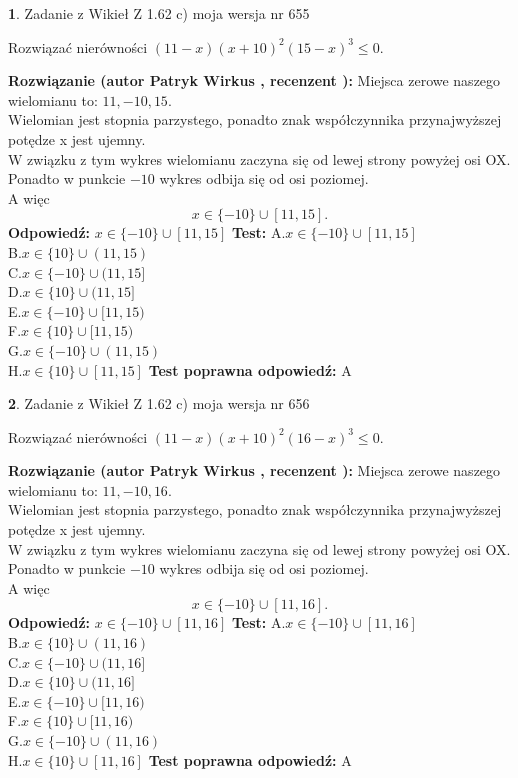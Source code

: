\documentclass[12pt, a4paper]{article}
\theoremstyle{definition} %
\newtheorem{zad}{}
\newcommand{\zadStart}[1]{\begin{zad}#1\newline}
\newcommand{\zadStop}{\end{zad}}
\newcommand{\rozwStart}[2]{\noindent \textbf{Rozwiązanie (autor #1 , recenzent #2): }\newline}
\newcommand{\rozwStop}{\newline}
\newcommand{\odpStart}{\noindent \textbf{Odpowiedź:}\newline}
\newcommand{\odpStop}{\newline}
\newcommand{\testStart}{\noindent \textbf{Test:}\newline}
\newcommand{\testStop}{\newline}
\newcommand{\kluczStart}{\noindent \textbf{Test poprawna odpowiedź:}\newline}
\newcommand{\kluczStop}{\newline}
\begin{document}
\zadStart{Zadanie z Wikieł Z 1.62 c) moja wersja nr 655}

Rozwiązać nierówności $(11-x)(x+10)^{2}(15-x)^{3}\le0$.
\zadStop
\rozwStart{Patryk Wirkus}{}
Miejsca zerowe naszego wielomianu to: $11, -10, 15$.\\
Wielomian jest stopnia parzystego, ponadto znak współczynnika przy\linebreak najwyższej potędze x jest ujemny.\\ W związku z tym wykres wielomianu zaczyna się od lewej strony powyżej osi OX.\\
Ponadto w punkcie $-10$ wykres odbija się od osi poziomej.\\
A więc $$x \in \{-10\} \cup [11,15].$$
\rozwStop
\odpStart
$x \in \{-10\} \cup [11,15]$
\odpStop
\testStart
A.$x \in \{-10\} \cup [11,15]$\\
B.$x \in \{10\} \cup (11,15)$\\
C.$x \in \{-10\} \cup (11,15]$\\
D.$x \in \{10\} \cup (11,15]$\\
E.$x \in \{-10\} \cup [11,15)$\\
F.$x \in \{10\} \cup [11,15)$\\
G.$x \in \{-10\} \cup (11,15)$\\
H.$x \in \{10\} \cup [11,15]$
\testStop
\kluczStart
A
\kluczStop



\zadStart{Zadanie z Wikieł Z 1.62 c) moja wersja nr 656}

Rozwiązać nierówności $(11-x)(x+10)^{2}(16-x)^{3}\le0$.
\zadStop
\rozwStart{Patryk Wirkus}{}
Miejsca zerowe naszego wielomianu to: $11, -10, 16$.\\
Wielomian jest stopnia parzystego, ponadto znak współczynnika przy\linebreak najwyższej potędze x jest ujemny.\\ W związku z tym wykres wielomianu zaczyna się od lewej strony powyżej osi OX.\\
Ponadto w punkcie $-10$ wykres odbija się od osi poziomej.\\
A więc $$x \in \{-10\} \cup [11,16].$$
\rozwStop
\odpStart
$x \in \{-10\} \cup [11,16]$
\odpStop
\testStart
A.$x \in \{-10\} \cup [11,16]$\\
B.$x \in \{10\} \cup (11,16)$\\
C.$x \in \{-10\} \cup (11,16]$\\
D.$x \in \{10\} \cup (11,16]$\\
E.$x \in \{-10\} \cup [11,16)$\\
F.$x \in \{10\} \cup [11,16)$\\
G.$x \in \{-10\} \cup (11,16)$\\
H.$x \in \{10\} \cup [11,16]$
\testStop
\kluczStart
A
\kluczStop
\end{document}
